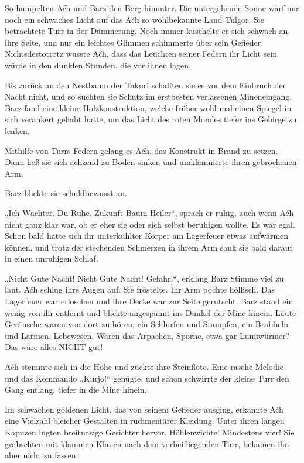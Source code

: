 So humpelten Aćh und Barz den Berg hinunter. Die untergehende Sonne warf nur noch ein schwaches Licht auf das Aćh so wohlbekannte Land Tulgor. Sie betrachtete Turr in der Dämmerung. Noch immer kuschelte er sich schwach an ihre Seite, und nur ein leichtes Glimmen schimmerte über sein Gefieder. Nichtsdestotrotz wusste Aćh, dass das Leuchten seiner Federn ihr Licht sein würde in den dunklen Stunden, die vor ihnen lagen.

Bis zurück an den Nestbaum der Takuri schafften sie es vor dem Einbruch der Nacht nicht, und so suchten sie Schutz im erstbesten verlassenen Mineneingang. Barz fand eine kleine Holzkonstruktion, welche früher wohl mal einen Spiegel in sich verankert gehabt hatte, um das Licht des roten Mondes tiefer ins Gebirge zu lenken.

Mithilfe von Turrs Federn gelang es Aćh, das Konstrukt in Brand zu setzen. Dann ließ sie sich ächzend zu Boden sinken und umklammerte ihren gebrochenen Arm.

Barz blickte sie schuldbewusst an.

„Ich Wächter. Du Ruhe. Zukunft Baum Heiler“, sprach er ruhig, auch wenn Aćh nicht ganz klar war, ob er eher sie oder sich selbst beruhigen wollte. Es war egal. Schon bald hatte sich ihr unterkühlter Körper am Lagerfeuer etwas aufwärmen können, und trotz der stechenden Schmerzen in ihrem Arm sank sie bald darauf in einen unruhigen Schlaf.



\trennzeichen



„Nicht Gute Nacht! Nicht Gute Nacht! Gefahr!“, erklang Barz Stimme viel zu laut. Aćh schlug ihre Augen auf. Sie fröstelte. Ihr Arm pochte höllisch. Das Lagerfeuer war erloschen und ihre Decke war zur Seite gerutscht. Barz stand ein wenig von ihr entfernt und blickte angespannt ins Dunkel der Mine hinein. Laute Geräusche waren von dort zu hören, ein Schlurfen und Stampfen, ein Brabbeln und Lärmen. Lebewesen. Waren das Arpachen, Sporne, etwa gar Lumiwürmer? Das wäre alles NICHT gut!

Aćh stemmte sich in die Höhe und zückte ihre Steinflöte. Eine rasche Melodie und das Kommando „Kurjo!“ genügte, und schon schwirrte der kleine Turr den Gang entlang, tiefer in die Mine hinein.

Im schwachen goldenen Licht, das von seinem Gefieder ausging, erkannte Aćh eine Vielzahl bleicher Gestalten in rudimentärer Kleidung. Unter ihren langen Kapuzen lugten breitnasige Gesichter hervor. Höhlenwichte! Mindestens vier! Sie grabschten mit klammen Klauen nach dem vorbeifliegenden Turr, bekamen ihn aber nicht zu fassen.


